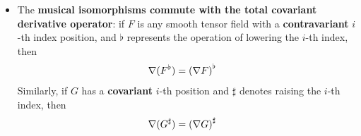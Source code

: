 \documentclass[11pt]{article}
\begin{document}
\begin{itemize}
\item \begin{proposition} 
The \textbf{musical isomorphisms commute with the total covariant derivative operator}: if $F$ is any smooth tensor field with a \textbf{contravariant} $i$-th index
position, and $\flat$ represents the operation of lowering the $i$-th index, then
\begin{align}
\nabla (F^{\flat}) &= \left(\nabla F\right)^{\flat}  \label{eqn: levi_civita_connection_flat_operation}
\end{align}
Similarly, if $G$ has a \textbf{covariant} $i$-th position and $\sharp$ denotes raising the $i$-th index, then
\begin{align}
\nabla (G^{\sharp}) &= \left(\nabla G\right)^{\sharp}  \label{eqn: levi_civita_connection_sharp_operation}
\end{align}
\end{proposition}
\end{itemize}
\end{document}
